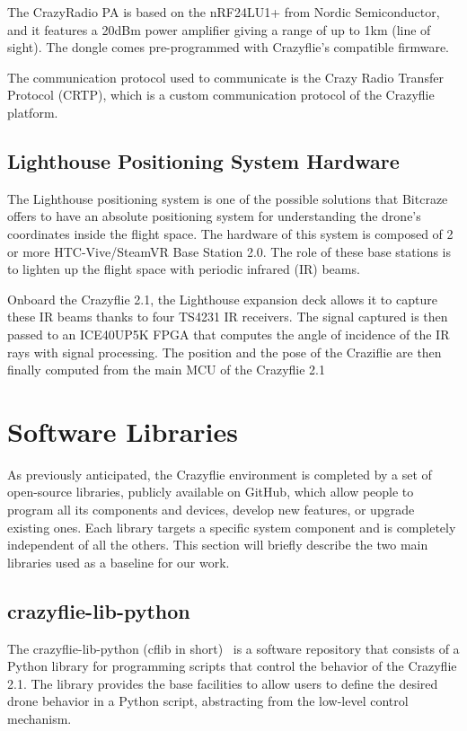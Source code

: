 The CrazyRadio PA is based on the nRF24LU1+ from Nordic Semiconductor, and it features a 20dBm power amplifier giving a range of up to 1km (line of sight).
The dongle comes pre-programmed with Crazyflie's compatible firmware.

The communication protocol used to communicate is the Crazy Radio Transfer Protocol (CRTP), 
which is a custom communication protocol of the Crazyflie platform. %

\subsection{Lighthouse Positioning System Hardware}\label{subsec:lighthouse_hardware}
The Lighthouse positioning system is one of the possible solutions that Bitcraze offers to have an absolute positioning system for understanding the drone's coordinates inside the flight space. 
The hardware of this system is composed of 2 or more HTC-Vive/SteamVR Base Station 2.0. 
The role of these base stations is to lighten up the flight space with periodic infrared (IR) beams.

Onboard the Crazyflie 2.1, the Lighthouse expansion deck allows it to capture these IR beams thanks to four TS4231 IR receivers. 
The signal captured is then passed to an ICE40UP5K FPGA that computes the angle of incidence of the IR rays with signal processing. 
The position and the pose of the Craziflie are then finally computed from the main MCU of the Crazyflie 2.1 %


\section{Software Libraries}\label{sec:software_libraries}
As previously anticipated, the Crazyflie environment is completed by a set of open-source libraries, 
publicly available on GitHub, which allow people to program all its components and devices, 
develop new features, or upgrade existing ones. Each library targets a specific system component and is completely independent of all the others. 
This section will briefly describe the two main libraries used as a baseline for our work. 

\subsection{crazyflie-lib-python}\label{subsec:crazyflie_lib_python}
The crazyflie-lib-python (cflib in short)~\cite{crazyflie-lib-python} is a software repository that consists of a Python library for programming scripts that control the behavior of the Crazyflie 2.1.
The library provides the base facilities to allow users to define the desired drone behavior in a Python script, abstracting from the low-level control mechanism.

